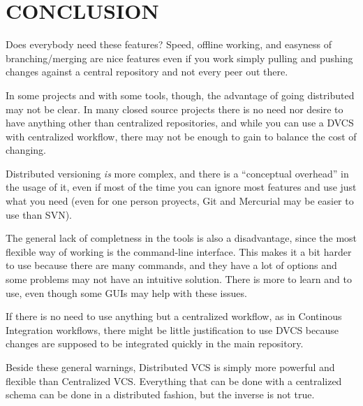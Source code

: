 \documentclass[a4paper,10pt]{article}
\begin{document}
\section{CONCLUSION}

Does everybody need these features? Speed, offline working, 
and easyness of branching/merging are nice features even if you work simply pulling 
and pushing changes against a central repository and not every peer out there. 

In some projects and with some tools, though, the advantage of going distributed may not be clear. 
In many closed source projects there is no need nor desire to have anything
other than centralized repositories, and while you can use a DVCS with centralized
workflow, there may not be enough to gain to balance the cost of changing.

Distributed versioning \emph{is} more complex, and there is a ``conceptual overhead'' in the usage 
of it, even if most of the time you can ignore most features and use just what you need 
(even for one person proyects, Git and Mercurial may be easier to use than SVN).

The general lack of completness in the tools is also a disadvantage, since the most flexible
way of working is the command-line interface. This makes it a bit harder to use because there 
are many commands, and they have a lot of options and some problems may not have an intuitive 
solution. There is more to learn and to use, even though some GUIs may help with these issues.

If there is no need to use anything but a centralized workflow, as in Continous Integration 
workflows, there might be little justification to use DVCS because changes are supposed to be 
integrated quickly in the main repository.

Beside these general warnings, Distributed VCS is simply more powerful and flexible than Centralized VCS.
Everything that can be done with a centralized schema can be done in a distributed fashion, but the inverse
is not true. 
\end{document}
